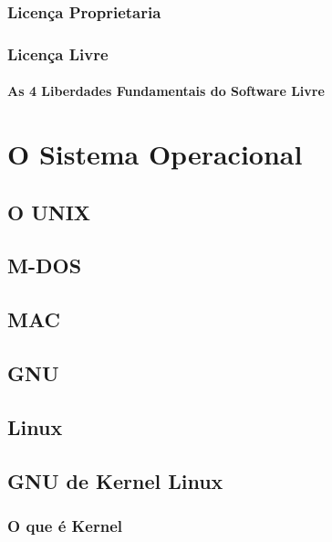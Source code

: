 \subsection[Licença Proprietária]{Licença Proprietaria}


\subsection[Licença Livre]{Licença Livre}


\subsubsection[As 4 Liberdades Fundamentais do Software Livre]{As 4 Liberdades Fundamentais do Software Livre}


\chapter[\large O Sistema Operacional]{O Sistema Operacional}

\section [\large O UNIX]{O UNIX}

\section[M-DOS]{M-DOS}

\section[MAC]{MAC}

\section[GNU]{GNU}

\section[Linux]{Linux}

\section[GNU de Kernel Linux]{GNU de Kernel Linux}

\subsection[O que é Kernel]{O que é Kernel}

